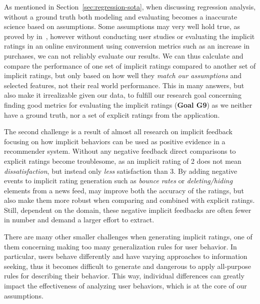 As mentioned in Section~\ref{sec:regression-sota}, when discussing regression
analysis, without a ground truth both modeling and evaluating becomes a
inaccurate science based on assumptions. Some assumptions may very well hold
true, as proved by in~\cite{parra2011walk}, however without conducting user
studies or evaluating the implicit ratings in an online environment using
conversion metrics such as an increase in purchases, we can not reliably
evaluate our results. We can thus calculate and compare the performance of one
set of implicit ratings compared to another set of implicit ratings, but only
based on how well they \textit{match our assumptions} and selected features,
not their real world performance. This in many answers, but also make it
irrealizable given our data, to fulfill our research goal concerning finding
good metrics for evaluating the implicit ratings (\textbf{Goal G9}) as we
neither have a ground truth, nor a set of explicit ratings from the
application.

The second challenge is a result of almost all research on implicit feedback
focusing on how implicit behaviors can be used as positive evidence in a
recommender system. Without any negative feedback direct comparisons to
explicit ratings become troublesome, as an implicit rating of 2 does not mean
\textit{dissatisfaction}, but instead only \textit{less} satisfaction than 3.
By adding negative events to implicit rating generation such as \textit{bounce
rates} or \textit{deleting/hiding} elements from a news feed, may improve both
the accuracy of the ratings, but also make them more robust when comparing and
combined with explicit ratings. Still, dependent on the domain, these negative
implicit feedbacks are often fewer in number and demand a larger effort to
extract.

There are many other smaller challenges when generating implicit ratings, one
of them concerning making too many generalization rules for user behavior. In
particular, users behave differently and have varying approaches to information
seeking, thus it becomes difficult to generate and dangerous to apply
all-purpose rules for describing their behavior. This way, individual
differences can greatly impact the effectiveness of analyzing user behaviors,
which is at the core of our assumptions.

